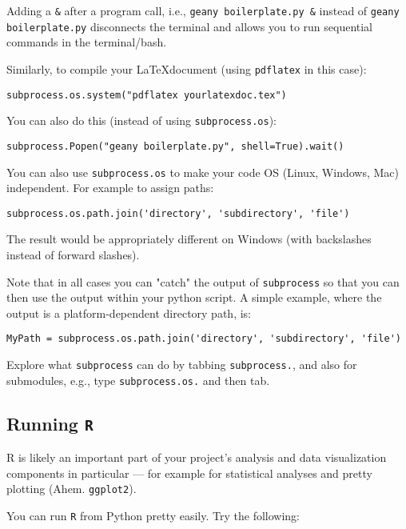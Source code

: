 Adding a {\tt \&} after a program call, i.e., {\tt geany boilerplate.py 
\&} instead of {\tt geany boilerplate.py} disconnects the terminal and 
allows you to run sequential commands in the terminal/bash.
 
Similarly, to compile your \LaTeX document (using {\tt pdflatex} in this case):

\begin{lstlisting}
subprocess.os.system("pdflatex yourlatexdoc.tex")
\end{lstlisting}
  
You can also do this (instead of using {\tt subprocess.os}):
\begin{lstlisting}
subprocess.Popen("geany boilerplate.py", shell=True).wait()
\end{lstlisting}
  
You can also use {\tt subprocess.os} to make your code OS (Linux, 
Windows, Mac) independent. For example to assign paths:
\begin{lstlisting}
subprocess.os.path.join('directory', 'subdirectory', 'file')
\end{lstlisting}

The result would be appropriately different on Windows (with 
backslashes instead of forward slashes). 

Note that in all cases you can "catch" the output of {\tt subprocess} 
so that you can then use the output within your python script. A simple
example, where the output is a platform-dependent directory path, is: 
\begin{lstlisting}
MyPath = subprocess.os.path.join('directory', 'subdirectory', 'file')
\end{lstlisting}
Explore what {\tt subprocess} can do by tabbing {\tt subprocess.}, and 
also for submodules, e.g., type {\tt subprocess.os.} and then tab.

\subsection{Running {\tt R}}

R is likely an important part of your project's analysis and data 
visualization components in particular --- for example for  statistical 
analyses and pretty plotting (Ahem. {\tt ggplot2}). 

You can run {\tt R} from Python pretty easily. Try the following:

